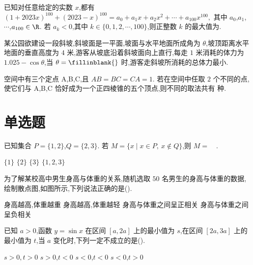 \begin{problem}
已知对任意给定的实数 \(x\),都有
\(
\left(1+2023x\right)^{100}+\left(2023-x\right)^{100}=a_0+a_1x+a_2x^2+\cdots+a_{100}x^{100},
\)
其中 \(a_0\),\(a_1\),\(\cdots\),\(a_{100}\in\R\). 若 \(a_k<0\),其中 \(k\in\{0,1,2,\cdots,100\}\),则正整数 \(k\) 的最大值为\fillinblank{}.
\end{problem}

\begin{problem}
某公园欲建设一段斜坡,斜坡面是一平面,坡面与水平地面所成角为 \(\theta\),坡顶距离水平地面的垂直高度为 \(4\) 米,游客从坡底沿着斜坡面向上直行,每走 \(1\) 米消耗的体力为 \(1.025-\cos\theta\),当 \(\theta=\fillinblank{}\) 时,游客走斜坡所消耗的总体力最小.
\end{problem}

\begin{problem}
空间中有三个定点 A,B,C,且 \(AB=BC=CA=1\). 若在空间中任取 \(2\) 个不同的点,使它们与 A,B,C 恰好成为一个正四棱锥的五个顶点,则不同的取法共有\fillinblank{} 种.
\end{problem}

\section{单选题}

\begin{problem}
已知集合 \(P=\{1,2\}\),\(Q=\{2,3\}\). 若 \(M=\{x\mid x\in P,\ x\notin Q\}\),则 \(M=\quad\).

\choices
    {\(\{1\}\)}
    {\(\{2\}\)}
    {\(\{3\}\)}
    {\(\{1,2,3\}\)}
\end{problem}

\begin{problem}
为了解某校高中男生身高与体重的关系,随机选取 \(50\) 名男生的身高与体重的数据,绘制散点图,如图所示,下列说法正确的是(\quad).


\choices
    {身高越高,体重越重}
    {身高越高,体重越轻}
    {身高与体重之间呈正相关}
    {身高与体重之间呈负相关}
\end{problem}

\begin{problem}
已知 \(a>0\),函数 \(y=\sin x\) 在区间 \(\left[a,2a\right]\) 上的最小值为 \(s\),在区间 \(\left[2a,3a\right]\) 上的最小值为 \(t\),当 \(a\) 变化时,下列一定不成立的是(\quad).

\choices
    {\(s>0,t>0\)}
    {\(s>0\),\(t<0\)}
    {\(s<0\),\(t<0\)}
    {\(s<0\),\(t>0\)}
\end{problem}

